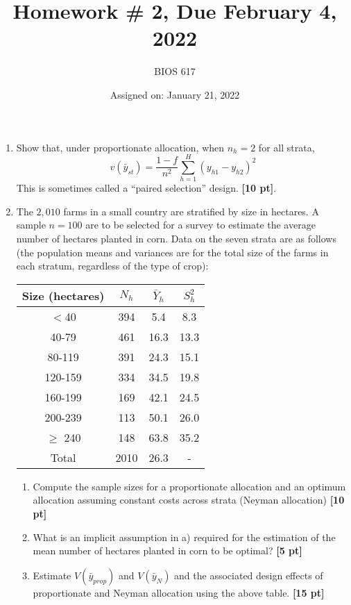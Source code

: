 \documentclass[12pt]{article}
\begin{document}
\title{Homework \# 2, Due February 4, 2022}
\author{BIOS 617}
\date{Assigned on: January 21, 2022}

\maketitle

\begin{enumerate}
\setlength{\itemsep}{15pt}%
\setlength{\parskip}{15pt}%

\item  Show that, under proportionate allocation, when $n_h = 2$ for all strata,
$$
v( \bar y_{st} ) = \frac{1-f}{n^2} \sum_{h=1}^H ( y_{h1} - y_{h2} )^2
$$
This is sometimes called a ``paired selection'' design.  {\bf [10 pt]}.

\item The $2,010$ farms in a small country are stratified by size in hectares. A sample $n = 100$ are to be selected for a survey to estimate the average number of hectares planted in corn. Data on the seven strata are as follows (the population means and variances are for the total size of the farms in each stratum, regardless of the type of crop):

\begin{table}[!th]
\centering
\begin{tabular}{c c c c}
Size (hectares) & $N_h$ & $\bar Y_h$ & $S_h^2$ \\ \hline
$<$40 & 394 & 5.4 & 8.3 \\
40-79 & 461 & 16.3 & 13.3 \\
80-119 & 391 & 24.3 & 15.1 \\
120-159 & 334 & 34.5 & 19.8 \\
160-199 & 169 & 42.1 & 24.5 \\
200-239 & 113 & 50.1 & 26.0 \\
$\geq$ 240 & 148 & 63.8 & 35.2 \\
Total & 2010 & 26.3 & - \\ \hline
\end{tabular}
\end{table}

	\begin{enumerate}
		\item Compute the sample sizes for a proportionate allocation and an optimum allocation assuming constant costs across strata (Neyman allocation) {\bf [10 pt]}
		\item What is an implicit assumption in a) required for the estimation of the mean number of hectares planted in corn to be optimal? {\bf [5 pt]}
		\item Estimate $V(\bar y_{prop} )$ and $V( \bar y_N )$ and the associated design effects of proportionate and Neyman allocation using the above table. {\bf [15 pt]}
	\end{enumerate}


\end{enumerate}
\end{document}
